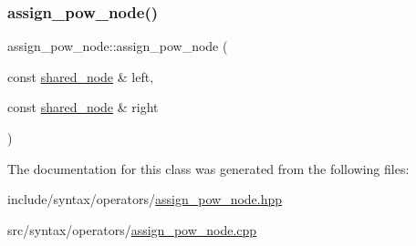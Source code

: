 \subsubsection{\texorpdfstring{assign\+\_\+pow\+\_\+node()}{assign\_pow\_node()}}
{\footnotesize\ttfamily assign\+\_\+pow\+\_\+node\+::assign\+\_\+pow\+\_\+node (\begin{DoxyParamCaption}\item[{const \hyperlink{namespacejawe_a3f307481d921b6cbb50cc8511fc2b544}{shared\+\_\+node} \&}]{left,  }\item[{const \hyperlink{namespacejawe_a3f307481d921b6cbb50cc8511fc2b544}{shared\+\_\+node} \&}]{right }\end{DoxyParamCaption})}



The documentation for this class was generated from the following files\+:\begin{DoxyCompactItemize}
\item 
include/syntax/operators/\hyperlink{assign__pow__node_8hpp}{assign\+\_\+pow\+\_\+node.\+hpp}\item 
src/syntax/operators/\hyperlink{assign__pow__node_8cpp}{assign\+\_\+pow\+\_\+node.\+cpp}\end{DoxyCompactItemize}
